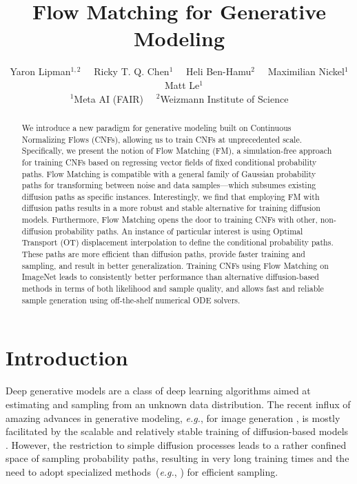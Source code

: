 \documentclass{article}
\title{Flow Matching for Generative Modeling}
\author{Yaron Lipman$^{1,2}$ \ \ Ricky T. Q. Chen$^{1}$ \ \ Heli Ben-Hamu$^{2}$ \ \ Maximilian Nickel$^{1}$ \ \ Matt Le$^{1}$ \\
    $^1$Meta AI (FAIR)  \ \
    $^2$Weizmann Institute of Science
}
\makeatletter
\newcommand{\eg}{{e.g.}}
\renewcommand*{\eg}{{\it e.g.}\@\xspace}
\makeatother
\begin{document}
\maketitle

\begin{abstract}
We introduce a new paradigm for generative modeling built on Continuous Normalizing Flows (CNFs), allowing us to train CNFs at unprecedented scale. Specifically, we present the notion of Flow Matching (FM), a simulation-free approach for training CNFs based on regressing vector fields of fixed conditional probability paths. Flow Matching is compatible with a general family of Gaussian probability paths for transforming between noise and data samples---which subsumes existing diffusion paths as specific instances. Interestingly, we find that employing FM with diffusion paths results in a more robust and stable alternative for training diffusion models. Furthermore, Flow Matching opens the door to training CNFs with other, non-diffusion probability paths. An instance of particular interest is using Optimal Transport (OT) displacement interpolation to define the conditional probability paths. These paths are more efficient than diffusion paths, provide faster training and sampling, and result in better generalization. Training CNFs using Flow Matching on ImageNet leads to consistently better performance than alternative diffusion-based methods in terms of both likelihood and sample quality, and allows fast and reliable sample generation using off-the-shelf numerical ODE solvers.\vspace{-5pt}
\end{abstract}


\section{Introduction}\vspace{-3pt}
%
Deep generative models are a class of deep learning algorithms aimed at estimating and sampling from an unknown data distribution.
%
The recent influx of amazing advances in generative modeling, \eg, for image generation \citet{ramesh2022hierarchical,rombach2022high}, is mostly facilitated by the scalable and relatively stable training of diffusion-based models \citet{ho2020denoising,song2020score}. However, the restriction to simple diffusion processes leads to a rather confined space of sampling probability paths, resulting in very long training times and the need to adopt specialized methods~(\eg, \citet{song2020denoising,zhang2022fast}) for efficient sampling.
\end{document}
